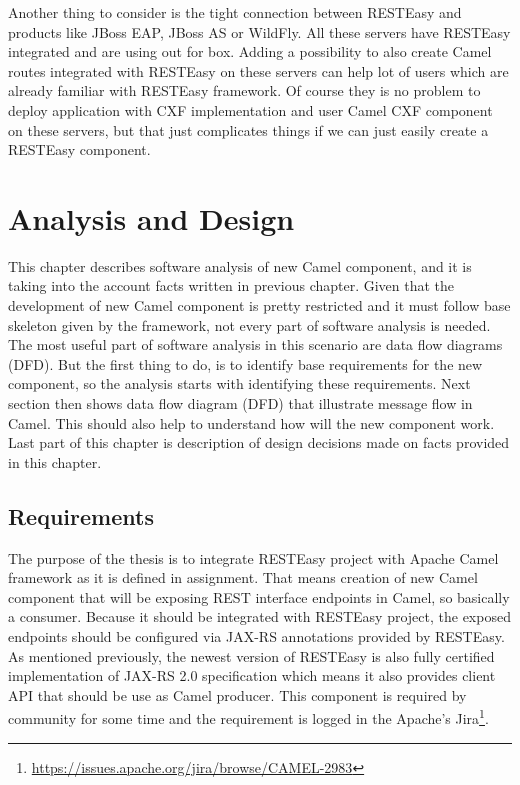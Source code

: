 \documentclass[12pt,final,oneside]{fithesis2}
\begin{document}
Another thing to consider is the tight connection between RESTEasy and products like JBoss EAP, JBoss AS or WildFly. All these servers have RESTEasy integrated and are using out for box. Adding a possibility to also create Camel routes integrated with RESTEasy on these servers can help lot of users which are already familiar with RESTEasy framework. Of course they is no problem to deploy application with CXF implementation and user Camel CXF component on these servers, but that just complicates things if we can just easily create a RESTEasy component. 

%
\chapter{Analysis and Design}
This chapter describes software analysis of new Camel component, and it is taking into the account facts written in previous chapter. Given that the development of new Camel component is pretty restricted and it must follow base skeleton given by the framework, not every part of software analysis is needed. The most useful part of software analysis in this scenario are data flow diagrams (DFD). But the first thing to do, is to identify base requirements for the new component, so the analysis starts with identifying these requirements. Next section then shows data flow diagram (DFD) that illustrate message flow in Camel. This should also help to understand how will the new component work. Last part of this chapter is description of design decisions made on facts provided in this chapter. 

\section{Requirements}
The purpose of the thesis is to integrate RESTEasy project with Apache Camel framework as it is defined in assignment. That means creation of new Camel component that will be exposing REST interface endpoints in Camel, so basically a consumer. Because it should be integrated with RESTEasy project, the exposed endpoints should be configured via JAX-RS annotations provided by RESTEasy. As mentioned previously, the newest version of RESTEasy is also fully certified implementation of JAX-RS 2.0 specification which means it also provides client API that should be use as Camel producer. This component is required by community for some time and the requirement is logged in  
the Apache's Jira\footnote{\url{https://issues.apache.org/jira/browse/CAMEL-2983}}.
\end{document}
